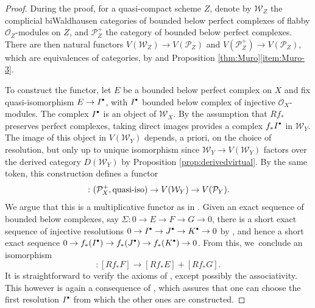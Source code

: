 \documentclass[JEP,XML,SOM,Unicode,published]{cedram}
\newcommand{\sbullet}{{\scriptscriptstyle\bullet}}
\newcommand{\csbullet}{{\raisebox{1pt}{$\sbullet$}}}
\theoremstyle{plain}
\theoremstyle{definition}
\newcommand{\Ocal}{\mathcal O}
\newcommand{\Pcal}{\mathcal P}
\newcommand{\Wcal}{\mathcal W}
\begin{document}
\begin{proof}
During the proof, for a quasi-compact scheme $Z$, denote by $\Wcal_{Z}$ the complicial biWaldhausen categories of bounded below perfect complexes of flabby $\Ocal_{Z}$\nobreakdash-mod\-ules on $Z$, and $\Pcal^+_Z$ the category of bounded below perfect complexes. There are then natural functors $V(\Wcal_{Z}) \to V(\Pcal_Z)$ and $V(\Pcal^+_Z) \to V(\Pcal_Z)$, which are equivalences of categories, by \cite[Lem.\,3.5]{ThomasonTrobaugh} and Proposition \ref{thm:Muro}\eqref{item:Muro-3}.

To construct the functor, let $E$ be a bounded below perfect complex on $X$ and fix quasi-isomorphism $E\to I^{\csbullet}$, with $I^{\csbullet}$ bounded below complex of injective $\Ocal_X$\nobreakdash-mod\-ules. The complex $I^{\csbullet}$ is an object of $\Wcal_{X}$. By the assumption that $Rf_{\ast}$ preserves perfect complexes, taking direct images provides a complex $f_\ast I^{\csbullet}$ in $\Wcal_Y$. The image of this object in $V(\Wcal_Y)$ depends, a priori, on the choice of resolution, but only up to unique isomorphism since $\Wcal_{Y}\to V(\Wcal_{Y})$ factors over the derived category $D(\Wcal_Y)$ by Proposition \ref{prop:derivedvirtual}. By the same token, this construction defines a functor
\begin{displaymath}
[Rf_{\ast}(\cdot)]\colon (\Pcal^+_{X},\hbox{quasi-iso})\to V(\Wcal_Y) \to V(\Pcal_Y).
\end{displaymath}
We argue that this is a multiplicative functor as in \cite[Def.\,1.2.3]{Muro:determinant}. Given an exact sequence of bounded below complexes, say $\Sigma: 0 \to E \to F \to G \to 0$, there is a short exact sequence of injective resolutions $0 \to I^{\csbullet} \to J^{\csbullet} \to K^{\csbullet} \to 0$ by \cite[\href{https://stacks.math.columbia.edu/tag/013T}{013T}]{stacks-project}, and hence a short exact sequence $0 \to f_\ast (I^{\csbullet}) \to f_\ast (J^{\csbullet}) \to f_\ast (K^{\csbullet}) \to 0$. From this, we~conclude an isomorphism
\begin{displaymath}
[\Sigma]: [Rf_\ast F] \to [Rf_\ast E] + [Rf_\ast G].
\end{displaymath}
It is straightforward to verify the axioms of \cite[Def.\,1.2.3]{Muro:determinant}, except possibly the associativity. This however is again a consequence of \cite[\href{https://stacks.math.columbia.edu/tag/013T}{013T}]{stacks-project}, which assures that one can choose the first resolution $I^{\csbullet}$ from which the other ones are constructed.


\end{proof}
\end{document}
